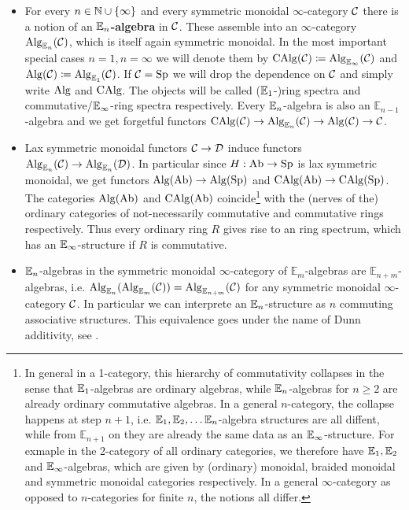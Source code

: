 \begin{itemize}
    \item For every $n\in\mathbb{N}\cup\{\infty\}$ and every symmetric monoidal $\infty$-category $\mathcal{C}$ there is a notion of an \textbf{$\mathbb{E}_n$-algebra} in $\mathcal{C}$. 
    These assemble into an $\infty$-category $\operatorname{Alg}_{\mathbb{E}_n}(\mathcal{C})$, which is itself again symmetric monoidal. 
    In the most important special cases $n=1,n=\infty$ we will denote them by $\operatorname{CAlg}(\mathcal{C})\coloneqq \operatorname{Alg}_{\mathbb{E}_\infty}(\mathcal{C})$ and $\operatorname{Alg}(\mathcal{C})\coloneqq \operatorname{Alg}_{\mathbb{E}_1}(\mathcal{C})$. If $\mathcal{C}=\operatorname{Sp}$ we will drop the dependence on $\mathcal{C}$ and simply write $\operatorname{Alg}$ and $\operatorname{CAlg}$. The objects will be called ($\mathbb{E}_1$-)ring spectra and commutative/$\mathbb{E}_\infty$-ring spectra respectively.
    Every $\mathbb{E}_n$-algebra is also an $\mathbb{E}_{n-1}$-algebra and we get forgetful functors $\operatorname{CAlg}(\mathcal{C})\rightarrow \operatorname{Alg}_{\mathbb{E}_n}(\mathcal{C})\rightarrow \operatorname{Alg}(\mathcal{C})\rightarrow \mathcal{C}$. 
    \item Lax symmetric monoidal functors $\mathcal{C}\rightarrow\mathcal{D}$ induce functors $\operatorname{Alg}_{\mathbb{E}_n}(\mathcal{C})\rightarrow \operatorname{Alg}_{\mathbb{E}_n}(\mathcal{D})$. In particular since $H:\operatorname{Ab}\rightarrow\operatorname{Sp}$ is lax symmetric monoidal, we get functors $\operatorname{Alg}(\operatorname{Ab})\rightarrow \operatorname{Alg}(\operatorname{Sp})$ and  $\operatorname{CAlg}(\operatorname{Ab})\rightarrow \operatorname{CAlg}(\operatorname{Sp})$. The categories $\operatorname{Alg}(\operatorname{Ab})$ and $\operatorname{CAlg}(\operatorname{Ab})$ coincide\footnote{In general in a 1-category, this hierarchy of commutativity collapses in the sense that $\mathbb{E}_1$-algebras are ordinary algebras, while $\mathbb{E}_n$-algebras for $n\geq 2$ are already ordinary commutative algebras.
    In a general $n$-category, the collapse happens at step $n+1$, i.e. $\mathbb{E}_1,\mathbb{E}_2,\dots \mathbb{E}_n$-algebra structures are all diffent, while from $\mathbb{E}_{n+1}$ on they are already the same data as an $\mathbb{E}_\infty$-structure. For exmaple in the 2-category of all ordinary categories, we therefore have $\mathbb{E}_1,\mathbb{E}_2$ and $\mathbb{E}_\infty$-algebras, which are given by (ordinary) monoidal, braided monoidal and symmetric monoidal categories respectively. In a general $\infty$-category as opposed to $n$-categories for finite $n$, the notions all differ.} with the (nerves of the) ordinary categories of not-necessarily commutative and commutative rings respectively. Thus every ordinary ring $R$ gives rise to an ring spectrum, which has an $\mathbb{E}_\infty$-structure if $R$ is commutative.
    \item $\mathbb{E}_n$-algebras in the symmetric monoidal $\infty$-category of $\mathbb{E}_m$-algebras are $\mathbb{E}_{n+m}$-algebras, i.e. $\operatorname{Alg}_{\mathbb{E}_n}(\operatorname{Alg}_{\mathbb{E}_m}(\mathcal{C}))=\operatorname{Alg}_{\mathbb{E}_{n+m}}(\mathcal{C})$ for any symmetric monoidal $\infty$-category $\mathcal{C}$. In particular we can interprete an $\mathbb{E}_n$-structure as $n$ commuting associative structures. This equivalence goes under the name of Dunn additivity, see \cite[Theorem~5.1.2.2]{lurie2017higher}.

\end{itemize}
